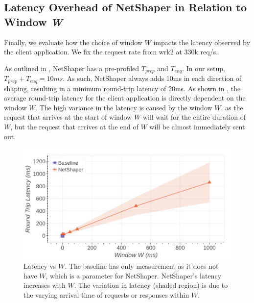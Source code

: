 \subsection{Latency Overhead of NetShaper in Relation to Window \textit{W}}
\label{subsec:netshaper-evaluation-latency}

Finally, we evaluate how the choice of window $W$ impacts the latency observed by the client application.
We fix the request rate from wrk2 at 330k req/s.

As outlined in , NetShaper has a pre-profiled $T_{prep}$ and $T_{enq}$.
In our setup, $T_{prep} + T_{enq} = 10ms$.
As such, NetShaper always adds 10ms in each direction of shaping, resulting in a minimum round-trip latency of 20ms.
As shown in , the average round-trip latency for the client application is directly dependent on the window $W$.
The high variance in the latency is caused by the window $W$, as the request that arrives at the start of window $W$ will wait for the entire duration of $W$, but the request that arrives at the end of $W$ will be almost immediately sent out.

\begin{figure}[!htb]
    \centering
    \includegraphics[width=\columnwidth]{figures/netshaper/evaluation/http_latency.png}
    \caption{Latency vs $W$. The baseline has only measurement as it does not have $W$, which is a parameter for NetShaper.
    NetShaper's latency increases with $W$.
    The variation in latency (shaded region) is due to the varying arrival time of requests or responses within $W$.}
    \label{fig:netshaper-eval-http-latency}
\end{figure}